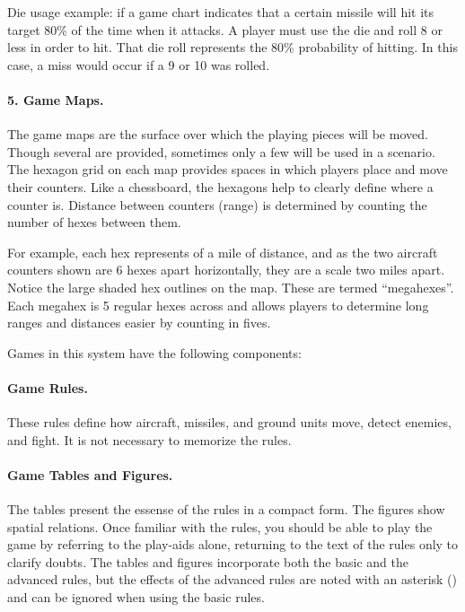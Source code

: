 {Die usage example: if a game chart indicates that a certain missile will hit its target 80\% of the time when it attacks. A player must use the die and roll 8 or less in order to hit. That die roll represents the 80\% probability of hitting. In this case, a miss would occur if a 9 or 10 was rolled.

\paragraph{5. Game Maps.} The game maps are the surface over which the playing pieces will be moved. Though several are provided, sometimes only a few will be used in a scenario. The hexagon grid on each map provides spaces in which players place and move their counters. Like a chessboard, the hexagons help to clearly define where a counter is. Distance between counters (range) is determined by counting the number of hexes between them. 

For example,  each hex represents {\onethird} of a mile of distance, and as the two aircraft counters shown are 6 hexes apart horizontally, they are a scale two miles apart. 
Notice the large shaded hex outlines on the map. These are termed “megahexes”. Each megahex is 5 regular hexes across and allows players to determine long ranges and distances easier by counting in fives. 

}{

Games in this system have the following components:

\paragraph{Game Rules.} These rules define how aircraft, missiles, and ground units move, detect enemies, and fight. It is not necessary to memorize the rules. 

\paragraph{Game Tables and Figures.} The tables present the essense of the rules in a compact form. The figures show spatial relations. Once familiar with the rules, you should be able to play the game by referring to the play-aids alone, returning to the text of the rules only to clarify doubts. The tables and figures incorporate both the basic and the advanced rules, but the effects of the advanced rules are noted with an asterisk (\asteriskmark) and can be ignored when using the basic rules.

}
